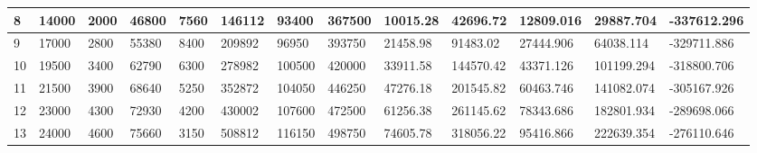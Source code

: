 \begin{table}[]
{\begin{tabular}{|l|l|l|l|l|l|l|l|l|l|l|l|l|}
        8     & 14000     & 2000          & 46800                                                 & 7560                                                           & 146112                                                   & 93400                                                      & 367500                                                          & 10015.28  & 42696.72   & 12809.016     & 29887.704        & -337612.296     \\ \hline
        9     & 17000     & 2800          & 55380                                                 & 8400                                                           & 209892                                                   & 96950                                                      & 393750                                                          & 21458.98  & 91483.02   & 27444.906     & 64038.114        & -329711.886     \\ \hline
        10    & 19500     & 3400          & 62790                                                 & 6300                                                           & 278982                                                   & 100500                                                     & 420000                                                          & 33911.58  & 144570.42  & 43371.126     & 101199.294       & -318800.706     \\ \hline
        11    & 21500     & 3900          & 68640                                                 & 5250                                                           & 352872                                                   & 104050                                                     & 446250                                                          & 47276.18  & 201545.82  & 60463.746     & 141082.074       & -305167.926     \\ \hline
        12    & 23000     & 4300          & 72930                                                 & 4200                                                           & 430002                                                   & 107600                                                     & 472500                                                          & 61256.38  & 261145.62  & 78343.686     & 182801.934       & -289698.066     \\ \hline
        13    & 24000     & 4600          & 75660                                                 & 3150                                                           & 508812                                                   & 116150                                                     & 498750                                                          & 74605.78  & 318056.22  & 95416.866     & 222639.354       & -276110.646     \\ \hline

\end{tabular}}
\end{table}
